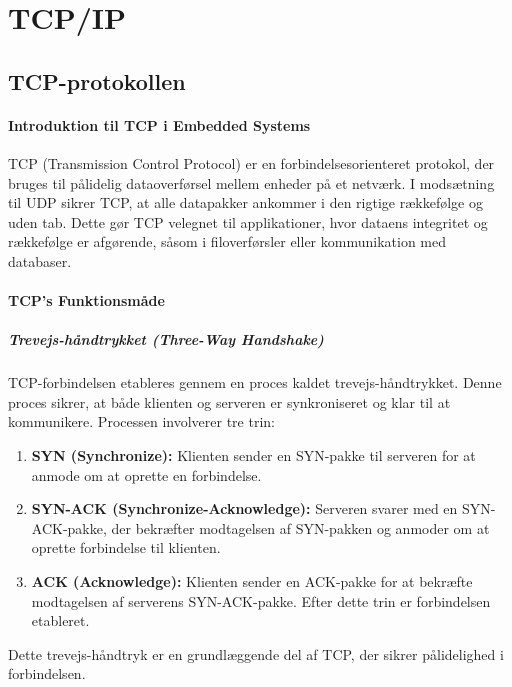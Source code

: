 
\chapter{TCP/IP}
\section{TCP-protokollen}
\subsubsection*{Introduktion til TCP i Embedded Systems}
TCP (Transmission Control Protocol) er en forbindelsesorienteret protokol, der bruges til pålidelig dataoverførsel mellem enheder på et netværk. I modsætning til UDP sikrer TCP, at alle datapakker ankommer i den rigtige rækkefølge og uden tab. Dette gør TCP velegnet til applikationer, hvor dataens integritet og rækkefølge er afgørende, såsom i filoverførsler eller kommunikation med databaser.

\subsubsection*{TCP's Funktionsmåde}
\paragraph{Trevejs-håndtrykket (Three-Way Handshake)}
TCP-forbindelsen etableres gennem en proces kaldet trevejs-håndtrykket. Denne proces sikrer, at både klienten og serveren er synkroniseret og klar til at kommunikere. Processen involverer tre trin:
\begin{enumerate}
	\item \textbf{SYN (Synchronize):} Klienten sender en SYN-pakke til serveren for at anmode om at oprette en forbindelse.
	\item \textbf{SYN-ACK (Synchronize-Acknowledge):} Serveren svarer med en SYN-ACK-pakke, der bekræfter modtagelsen af SYN-pakken og anmoder om at oprette forbindelse til klienten.
	\item \textbf{ACK (Acknowledge):} Klienten sender en ACK-pakke for at bekræfte modtagelsen af serverens SYN-ACK-pakke. Efter dette trin er forbindelsen etableret.
\end{enumerate}
Dette trevejs-håndtryk er en grundlæggende del af TCP, der sikrer pålidelighed i forbindelsen.

